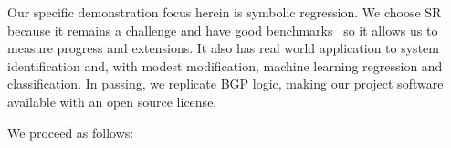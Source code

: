 Our specific demonstration focus herein is  symbolic regression. We choose SR because it remains a challenge and have good benchmarks~\cite{benchmarks} so it allows us to measure progress and extensions. It also has real world application to system identification and, with modest modification, machine learning regression and classification.  In passing, we replicate BGP logic, making our project software available with an open source license.

We proceed as follows:  
\vspace{1.0in}

